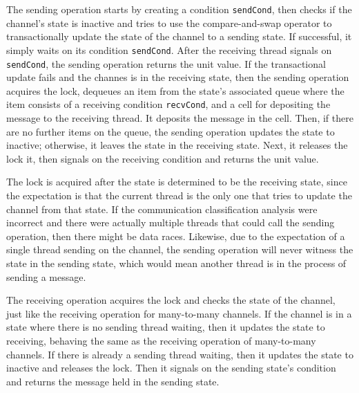 \documentclass[letterpaper, 11pt]{extarticle}
\begin{document}
The sending operation starts by creating a condition \lstinline{sendCond}, then checks
if the channel's state is inactive and tries to use the
compare-and-swap operator to transactionally update the state of
the channel to a sending state.
If successful, it simply waits on its condition \lstinline{sendCond}.
After the receiving thread signals on \lstinline{sendCond}, the sending operation returns the unit value.
If the transactional update fails and the channes is in the receiving state, then the sending operation acquires the lock, dequeues an item from the state's associated queue where the item consists of a receiving condition \lstinline{recvCond},
and a cell for depositing the message to the receiving thread. It deposits the message in the cell. Then,
if there are no further items on the queue, the sending operation updates the state to inactive;
otherwise, it leaves the state in the receiving state.
Next, it releases the lock it, then signals on the receiving condition and returns the unit value.

The lock is acquired after the state is determined to be the receiving state,
since the expectation is that the current thread is the only one
that tries to update the channel from that state. If the communication classification analysis were
incorrect and there were actually multiple threads that could call the sending operation,
then there might be data races. Likewise, due to the expectation of a single thread
sending on the channel, the sending operation will never witness the state in the sending state,
which would mean another thread is in the process of sending a message.

The receiving operation acquires the lock and checks
the state of the channel, just like the receiving operation for many-to-many channels.
If the channel is in a state where there is no sending thread waiting,
then it updates the state to receiving, behaving the same as the receiving operation of many-to-many channels.
If there is already a sending thread waiting, then it updates the state to inactive and
releases the lock. Then it signals on the sending state's condition and
returns the message held in the sending state.
\end{document}
